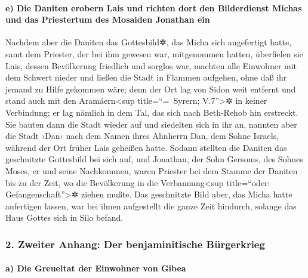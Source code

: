 \hypertarget{e-die-daniten-erobern-lais-und-richten-dort-den-bilderdienst-michas-und-das-priestertum-des-mosaiden-jonathan-ein}{%
\paragraph{e) Die Daniten erobern Lais und richten dort den Bilderdienst
Michas und das Priestertum des Mosaiden Jonathan
ein}\label{e-die-daniten-erobern-lais-und-richten-dort-den-bilderdienst-michas-und-das-priestertum-des-mosaiden-jonathan-ein}}

Nachdem aber die Daniten das Gottesbild✲, das Micha sich
angefertigt hatte, samt dem Priester, der bei ihm gewesen war,
mitgenommen hatten, überfielen sie Lais, dessen Bevölkerung friedlich
und sorglos war, machten alle Einwohner mit dem Schwert nieder und
ließen die Stadt in Flammen aufgehen, ohne daß ihr jemand
zu Hilfe gekommen wäre; denn der Ort lag von Sidon weit entfernt und
stand auch mit den Aramäern\textless sup title=``=~Syrern;
V.7''\textgreater✲ in keiner Verbindung; er lag nämlich in dem Tal, das
sich nach Beth-Rehob hin erstreckt. Sie bauten dann die Stadt wieder auf
und siedelten sich in ihr an, nannten aber die Stadt
›Dan‹ nach dem Namen ihres Ahnherrn Dan, dem Sohne Israels, während der
Ort früher Lais geheißen hatte. Sodann stellten die
Daniten das geschnitzte Gottesbild bei sich auf, und Jonathan, der Sohn
Gersoms, des Sohnes Moses, er und seine Nachkommen, waren Priester bei
dem Stamme der Daniten bis zu der Zeit, wo die Bevölkerung in die
Verbannung\textless sup title=``oder: Gefangenschaft''\textgreater✲
ziehen mußte. Das geschnitzte Bild aber, das Micha hatte
anfertigen lassen, war bei ihnen aufgestellt die ganze Zeit hindurch,
solange das Haus Gottes sich in Silo befand.

\hypertarget{zweiter-anhang-der-benjaminitische-buxfcrgerkrieg}{%
\subsubsection{2. Zweiter Anhang: Der benjaminitische
Bürgerkrieg}\label{zweiter-anhang-der-benjaminitische-buxfcrgerkrieg}}

\hypertarget{a-die-greueltat-der-einwohner-von-gibea}{%
\paragraph{a) Die Greueltat der Einwohner von
Gibea}\label{a-die-greueltat-der-einwohner-von-gibea}}


